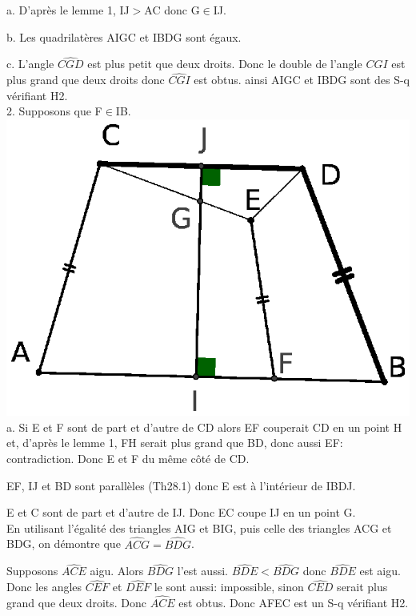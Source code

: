 \documentclass[a4paper, 12pt, twoside]{book}
\begin{document}
 a. D'après le lemme 1, IJ$>$AC donc G$\in$IJ. \
 
 b. Les quadrilatères AIGC et IBDG sont égaux.\
 
 c. L'angle $\hat{CGD}$ est plus petit que deux droits. Donc le double de l'angle $\hat{CGI}$ est plus grand que deux droits donc $\hat{CGI}$ est obtus. ainsi AIGC et IBDG sont des S-q vérifiant H2.\\
 
 2. Supposons que F$\in$IB.\\
 
 
  \includegraphics[scale=0.7]{figures/sacc137.eps}\\

  a. Si E et F sont de part et d'autre de CD alors EF couperait CD en un point H et, d'après le lemme 1, FH serait plus grand que BD, donc aussi EF: contradiction. Donc E et F du même côté de CD.\

EF, IJ et BD sont parallèles (Th28.1) donc E est à l'intérieur de IBDJ.\

E et C sont de part et d'autre de IJ. Donc EC coupe IJ en un point G.\\



En utilisant l'égalité des triangles AIG et BIG, puis celle des triangles ACG et BDG, on démontre que $\hat{ACG}=\hat{BDG}$.\

Supposons $\hat{ACE}$ aigu. Alors $\hat{BDG}$ l'est aussi. $\hat{BDE}<\hat{BDG}$ donc $\hat{BDE}$ est aigu. Donc les angles $\hat{CEF}$ et $\hat{DEF}$ le sont aussi: impossible, sinon $\hat{CED}$ serait plus grand que deux droits. Donc $\hat{ACE}$ est obtus. Donc AFEC est un S-q vérifiant H2.\\
\end{document}
